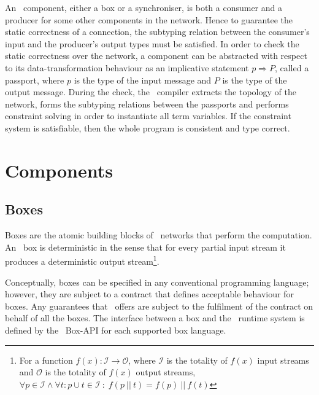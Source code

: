 An \ak\ component, either a box or a synchroniser, is both a consumer and a producer for some other components in the network. Hence to guarantee the static correctness of a connection, the subtyping relation between the consumer's input and the producer's output types must be satisfied. In order to check the static correctness over the network, a component can be abstracted with respect to its data-transformation behaviour as an implicative statement $p \Rightarrow P$, called a passport, where $p$ is the type of the input message and $P$ is the type of the output message. During the check, the \ak\ compiler extracts the topology of the network, forms the subtyping relations between the passports and performs constraint solving in order to instantiate all term variables. If the constraint system is satisfiable, then the whole program is consistent and type correct.


\section{Components}
    \subsection*{Boxes}
Boxes are the atomic building blocks of \ak\ networks that perform the computation. An \ak\ box is deterministic in the sense that for every partial input stream it produces a deterministic output stream\footnote{For a function $f(x): \mathcal{I} \to \mathcal{O}$, where $\mathcal{I}$ is the totality of $f(x)$ input streams and $\mathcal{O}$ is the totality of $f(x)$ output streams, $\forall p \in \mathcal{I} \land \forall t:p \cup t \in \mathcal{I} \: : \; f(p \:||\: t) = f(p) \:||\: f(t)$}.

Conceptually, boxes can be specified in any conventional programming language; however, they are subject to a contract that defines acceptable behaviour for boxes. Any guarantees that \ak\ offers are subject to the fulfilment of the contract on behalf of all the boxes. The interface between a box and the \ak\ runtime system is defined by the \ak\ Box-API for each supported box language.

